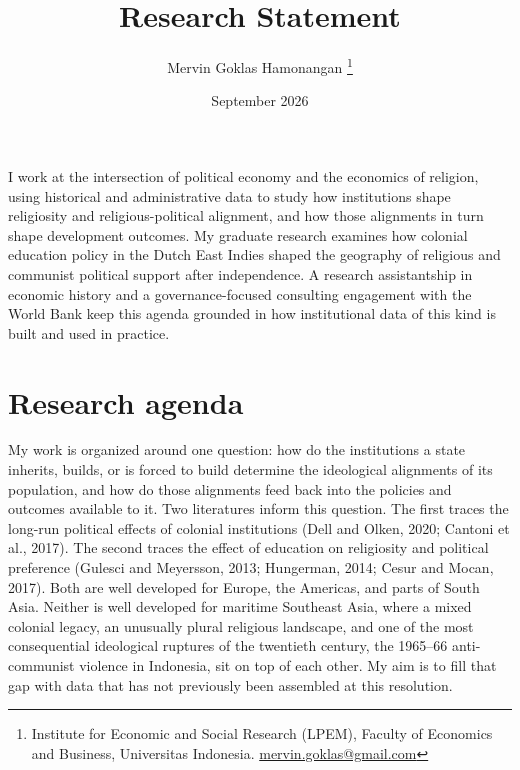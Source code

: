 \documentclass[letterpaper,11pt,leqno]{article}
\begin{document}
\title{Research Statement}

\author{Mervin Goklas Hamonangan
\thanks{Institute for Economic and Social Research (LPEM), Faculty of Economics and Business, Universitas Indonesia. \url{mervin.goklas@gmail.com}}}

\date{September 2026}


\begin{titlepage}
\maketitle

I work at the intersection of political economy and the economics of religion, using historical and administrative data to study how institutions shape religiosity and religious-political alignment, and how those alignments in turn shape development outcomes. My graduate research examines how colonial education policy in the Dutch East Indies shaped the geography of religious and communist political support after independence. A research assistantship in economic history and a governance-focused consulting engagement with the World Bank keep this agenda grounded in how institutional data of this kind is built and used in practice.

\end{titlepage}

\section{Research agenda}\label{s:agenda}

My work is organized around one question: how do the institutions a state inherits, builds, or is forced to build determine the ideological alignments of its population, and how do those alignments feed back into the policies and outcomes available to it. Two literatures inform this question. The first traces the long-run political effects of colonial institutions (Dell and Olken, 2020; Cantoni et al., 2017). The second traces the effect of education on religiosity and political preference (Gulesci and Meyersson, 2013; Hungerman, 2014; Cesur and Mocan, 2017). Both are well developed for Europe, the Americas, and parts of South Asia. Neither is well developed for maritime Southeast Asia, where a mixed colonial legacy, an unusually plural religious landscape, and one of the most consequential ideological ruptures of the twentieth century, the 1965--66 anti-communist violence in Indonesia, sit on top of each other. My aim is to fill that gap with data that has not previously been assembled at this resolution.
\end{document}

